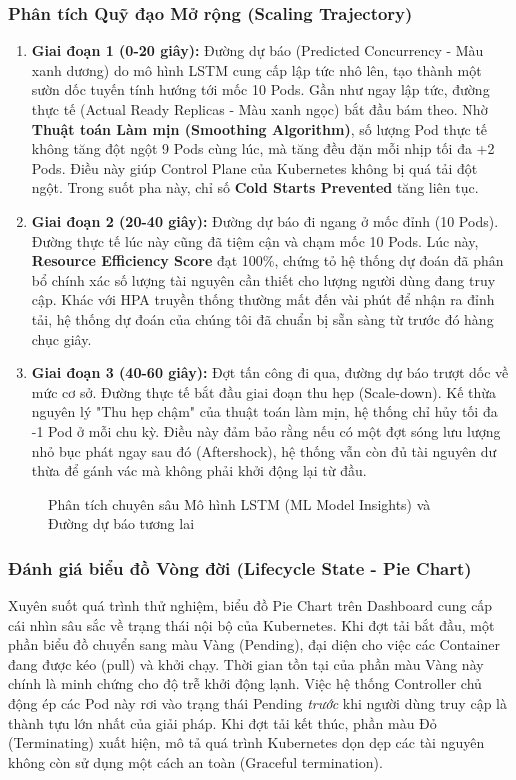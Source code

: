 \subsubsection{Phân tích Quỹ đạo Mở rộng (Scaling Trajectory)}
\begin{enumerate}
    \item \textbf{Giai đoạn 1 (0-20 giây):} Đường dự báo (Predicted Concurrency - Màu xanh dương) do mô hình LSTM cung cấp lập tức nhô lên, tạo thành một sườn dốc tuyến tính hướng tới mốc 10 Pods. Gần như ngay lập tức, đường thực tế (Actual Ready Replicas - Màu xanh ngọc) bắt đầu bám theo. Nhờ \textbf{Thuật toán Làm mịn (Smoothing Algorithm)}, số lượng Pod thực tế không tăng đột ngột 9 Pods cùng lúc, mà tăng đều đặn mỗi nhịp tối đa +2 Pods. Điều này giúp Control Plane của Kubernetes không bị quá tải đột ngột. Trong suốt pha này, chỉ số \textbf{Cold Starts Prevented} tăng liên tục.
    \item \textbf{Giai đoạn 2 (20-40 giây):} Đường dự báo đi ngang ở mốc đỉnh (10 Pods). Đường thực tế lúc này cũng đã tiệm cận và chạm mốc 10 Pods. Lúc này, \textbf{Resource Efficiency Score} đạt 100\%, chứng tỏ hệ thống dự đoán đã phân bổ chính xác số lượng tài nguyên cần thiết cho lượng người dùng đang truy cập. Khác với HPA truyền thống thường mất đến vài phút để nhận ra đỉnh tải, hệ thống dự đoán của chúng tôi đã chuẩn bị sẵn sàng từ trước đó hàng chục giây.
    \item \textbf{Giai đoạn 3 (40-60 giây):} Đợt tấn công đi qua, đường dự báo trượt dốc về mức cơ sở. Đường thực tế bắt đầu giai đoạn thu hẹp (Scale-down). Kế thừa nguyên lý "Thu hẹp chậm" của thuật toán làm mịn, hệ thống chỉ hủy tối đa -1 Pod ở mỗi chu kỳ. Điều này đảm bảo rằng nếu có một đợt sóng lưu lượng nhỏ bục phát ngay sau đó (Aftershock), hệ thống vẫn còn đủ tài nguyên dư thừa để gánh vác mà không phải khởi động lại từ đầu.
\end{enumerate}

\begin{figure}[h!]
    \centering
    \caption{Phân tích chuyên sâu Mô hình LSTM (ML Model Insights) và Đường dự báo tương lai}
    \label{fig:ml_tab}
\end{figure}

\subsubsection{Đánh giá biểu đồ Vòng đời (Lifecycle State - Pie Chart)}
Xuyên suốt quá trình thử nghiệm, biểu đồ Pie Chart trên Dashboard cung cấp cái nhìn sâu sắc về trạng thái nội bộ của Kubernetes. Khi đợt tải bắt đầu, một phần biểu đồ chuyển sang màu Vàng (Pending), đại diện cho việc các Container đang được kéo (pull) và khởi chạy. Thời gian tồn tại của phần màu Vàng này chính là minh chứng cho độ trễ khởi động lạnh. Việc hệ thống Controller chủ động ép các Pod này rơi vào trạng thái Pending \textit{trước} khi người dùng truy cập là thành tựu lớn nhất của giải pháp. Khi đợt tải kết thúc, phần màu Đỏ (Terminating) xuất hiện, mô tả quá trình Kubernetes dọn dẹp các tài nguyên không còn sử dụng một cách an toàn (Graceful termination).

